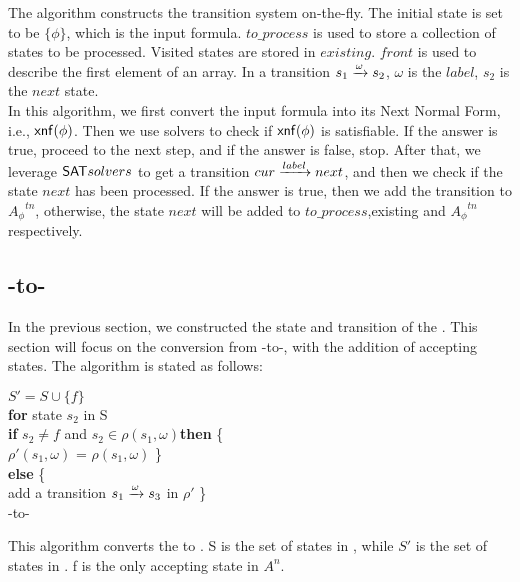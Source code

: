 The algorithm constructs the transition system on-the-fly. The initial state is set to be $\{\phi\}$, which is the input formula. $to\_process$ is used to store a collection of states to be processed. Visited states are stored in $existing$. $front$ is used to describe the first element of an array. In a transition $s_1\xrightarrow[]{\omega}s_2$, $\omega$ is the $label$, $s_2$ is the $next$ state. \\
In this algorithm, we first convert the input formula into its Next Normal Form, i.e., ${\sf xnf}(\phi)$. Then we use \SAT solvers to check if ${\sf xnf}(\phi)$ is satisfiable. If the answer is true, proceed to the next step, and if the answer is false, stop. After that, we leverage ${\sf SAT} solvers$ to get a transition $cur\xrightarrow[]{label}next$, and then we check if the state $next$ has been processed. If the answer is true, then we add the transition to ${A_{\phi}}^{tn}$, otherwise, the state $next$ will be added to  $to\_process$,existing and ${A_{\phi}}^{tn}$ respectively.


\subsection{\TNFA-to-\NFA}  
In the previous section, we constructed the state and transition of the \TNFA. This section will focus on the conversion from \TNFA-to-\NFA, with the addition of accepting states. The algorithm is stated as follows:\\

\IncMargin{1em}
 \begin{algorithm}[H]
    \SetAlgoNoLine
    \BlankLine
 
\qquad  $S' = S\cup \{f\}$   \\
\qquad  \textbf{for} state $s_2$ in S \\
\qquad \quad \textbf{if} $s_2\not = f$ and $s_2\in \rho(s_1, \omega)$\textbf{then} \{  \\
\qquad \qquad  $\rho'(s_1,\omega)$ = $\rho(s_1, \omega)$ \} \\
\qquad \quad \textbf{else} \{  \\
\qquad \qquad add a transition $s_1\xrightarrow[]{\omega}s_3$ in $\rho'$
\} \\
 \caption{\TNFA-to-\NFA}
\end{algorithm}

This algorithm converts the \TNFA to \NFA. S is the set of states in \TNFA, while $S'$ is the set of states in \NFA. f is the only accepting state in \NFA $A^{n}$. \\